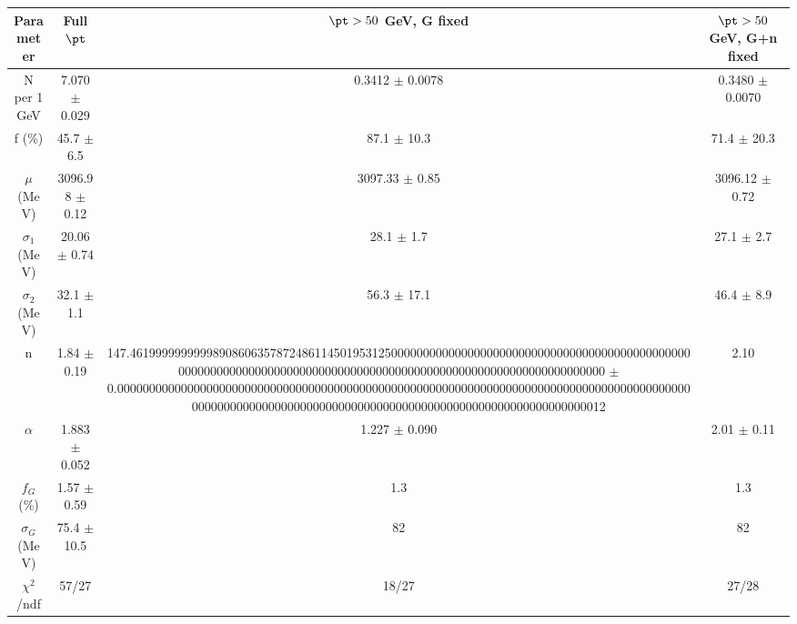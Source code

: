 \begin{tabular}{c||c|c|c}
Parameter & Full $\pt$ & $\pt>50$ GeV, G fixed & $\pt>50$ GeV, G+n fixed \\
\hline
N per 1 GeV & 7.070 $\pm$ 0.029 & 0.3412 $\pm$ 0.0078 & 0.3480 $\pm$ 0.0070\\
f (\%) & 45.7 $\pm$ 6.5 & 87.1 $\pm$ 10.3 & 71.4 $\pm$ 20.3\\
$\mu$ (MeV) & 3096.98 $\pm$ 0.12 & 3097.33 $\pm$ 0.85 & 3096.12 $\pm$ 0.72\\
$\sigma_1$ (MeV) & 20.06 $\pm$ 0.74 & 28.1 $\pm$ 1.7 & 27.1 $\pm$ 2.7\\
$\sigma_2$ (MeV) & 32.1 $\pm$ 1.1 & 56.3 $\pm$ 17.1 & 46.4 $\pm$ 8.9\\
n & 1.84 $\pm$ 0.19 & 147.46199999999998908606357872486114501953125000000000000000000000000000000000000000000000000000000000000000000000000000000000000000000000000000000000000000000 $\pm$ 0.00000000000000000000000000000000000000000000000000000000000000000000000000000000000000000000000000000000000000000000000000000000000000000000000000000000012 & 2.10\\
$\alpha$ & 1.883 $\pm$ 0.052 & 1.227 $\pm$ 0.090 & 2.01 $\pm$ 0.11\\
$f_G$ (\%) & 1.57 $\pm$ 0.59 & 1.3 & 1.3\\
$\sigma_G$ (MeV) & 75.4 $\pm$ 10.5 & 82 & 82\\
\hline
$\chi^2$/ndf & 57/27 & 18/27 & 27/28\\
\end{tabular}
